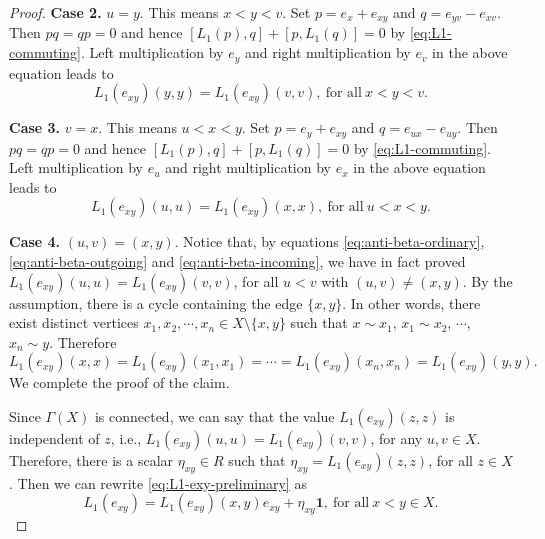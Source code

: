 \documentclass[reqno]{amsart}
\numberwithin{equation}{section}
\theoremstyle{plain}
\theoremstyle{definition}
\newcommand{\one}{\mathbf 1}
\begin{document}
\begin{proof}
{\bf Case 2.} $u=y$. This means $x<y<v$. Set $p=e_x+e_{xy}$ and $q=e_{yv}-e_{xv}$. Then $pq=qp=0$ and hence
$[L_1(p),q]+[p,L_1(q)]=0$ by \eqref{eq:L1-commuting}. Left multiplication by $e_y$ and right multiplication by $e_v$ in the above equation leads to
\begin{equation}\label{eq:anti-beta-outgoing}
L_1(e_{xy})(y,y)=L_1(e_{xy})(v,v), ~\text{for~all}~x<y<v.
\end{equation}

{\bf Case 3.} $v=x$. This means $u<x<y$. Set $p=e_y+e_{xy}$ and $q=e_{ux}-e_{uy}$. Then $pq=qp=0$ and hence
$[L_1(p),q]+[p,L_1(q)]=0$ by \eqref{eq:L1-commuting}.
Left multiplication by $e_u$ and right multiplication by $e_x$ in the above equation leads to
\begin{equation}\label{eq:anti-beta-incoming}
L_1(e_{xy})(u,u)=L_1(e_{xy})(x,x), ~\text{for~all}~u<x<y.
\end{equation}

{\bf Case 4.} $(u,v)=(x,y)$. Notice that, by equations \eqref{eq:anti-beta-ordinary}, \eqref{eq:anti-beta-outgoing} and
\eqref{eq:anti-beta-incoming}, we have in fact proved
$L_1(e_{xy})(u,u)=L_1(e_{xy})(v,v)$,
for all $u<v$ with $(u,v)\neq (x,y)$.
By the assumption, there is a cycle containing the edge $\{x,y\}$. In other words,
there exist distinct vertices $x_1,x_2,\cdots,x_n\in X\setminus \{x,y\}$ such that
$x\sim x_1$, $x_1\sim x_2$, $\cdots$, $x_n\sim y$. Therefore
\[
L_1(e_{xy})(x,x)=L_1(e_{xy})(x_1,x_1)=\cdots=L_1(e_{xy})(x_n,x_n)=L_1(e_{xy})(y,y).
\]
We complete the proof of the claim.

Since $\Gamma(X)$ is connected, we can say that the value $L_1(e_{xy})(z,z)$ is independent of $z$, i.e.,
$L_1(e_{xy})(u,u)=L_1(e_{xy})(v,v)$, for any $u,v\in X$. Therefore, there is a scalar $\eta_{xy}\in R$ such that
$\eta_{xy}=L_1(e_{xy})(z,z)$, for all $z\in X$. Then we can rewrite \eqref{eq:L1-exy-preliminary} as
\begin{equation}\label{eq:L1-exy-final}
L_1(e_{xy})=L_1(e_{xy})(x,y)e_{xy}+\eta_{xy}\one, ~\text{for~all}~x<y\in X.
\end{equation}


\end{proof}
\end{document}
